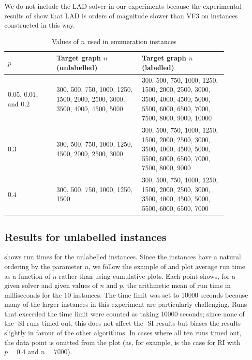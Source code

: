 We do not include the LAD solver in our experiments because
the experimental results of \cite{DBLP:journals/pami/CarlettiFSV18} show that LAD
is orders of magnitude slower than VF3 on instances constructed in
this way.

\begin{table}[h!]
\centering
\footnotesize
 \begin{tabular}{p{0.2\linewidth} p{0.35\linewidth} p{0.35\linewidth}}
 \toprule
     $p$ & Target graph $n$ (unlabelled) & Target graph $n$ (labelled) \\ [0.5ex]
 \midrule
     $0.05$, $0.01$, and $0.2$ &
         300, 500, 750, 1000, 1250, 1500, 2000, 2500, 3000, 3500, 4000, 4500, 5000 &
         300, 500, 750, 1000, 1250, 1500, 2000, 2500, 3000, 3500, 4000, 4500, 5000,
         5500, 6000, 6500, 7000, 7500, 8000, 9000, 10000\\
     \rule{0pt}{2.3ex}$0.3$ & 
        300, 500, 750, 1000, 1250, 1500, 2000, 2500, 3000 &
        300, 500, 750, 1000, 1250, 1500, 2000, 2500, 3000, 3500, 4000, 4500, 5000,
        5500, 6000, 6500, 7000, 7500, 8000, 9000 \\
     \rule{0pt}{2.3ex}$0.4$ & 300, 500, 750, 1000, 1250, 1500 &
        300, 500, 750, 1000, 1250, 1500, 2000, 2500, 3000, 3500, 4000, 4500, 5000, 5500, 6000, 6500, 7000 \\
 \bottomrule
\end{tabular}
\caption{Values of $n$ used in enumeration instances}
\label{tab:carletti-n}
\end{table}

\FloatBarrier

\subsection{Results for unlabelled instances}

 shows run times for the unlabelled instances.
Since the instances have a natural ordering by the parameter $n$, we follow the example
of \cite{DBLP:journals/pami/CarlettiFSV18} and plot average run time as a function of $n$
rather than using cumulative plots.
Each point shows, for a given solver and given values of $n$ and $p$, the arithmetic mean of
run time in milliseconds for the 10 instances.
The time limit was set to 10000 seconds because many of the larger instances in this experiment
are particularly challenging.  Runs that exceeded the time limit were counted as taking 10000 seconds;
since none of the \McSplit-SI runs timed out, this does not affect the \McSplit-SI results but biases
the results slightly in favour of the other algorithms.  In cases where all ten runs timed out,
the data point is omitted from the plot (as, for example,  is the case for RI with $p=0.4$ and $n=7000$).

